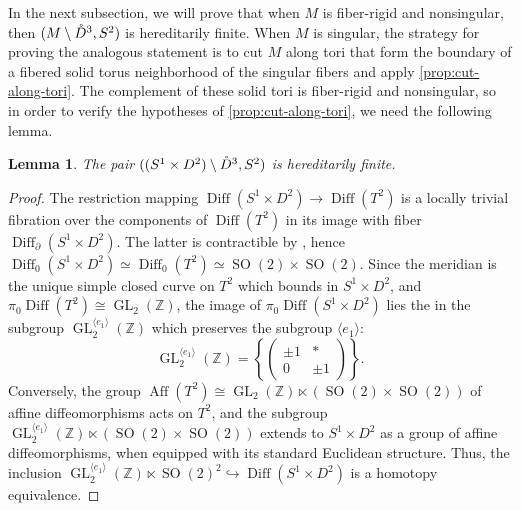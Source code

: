 \documentclass{amsart}
\theoremstyle{plain}
\newtheorem{lem}[thm]{Lemma}
\theoremstyle{definition}
\DeclareMathOperator\Diff{Diff}
\DeclareMathOperator\Aff{Aff}
\DeclareMathOperator\SO{SO}
\DeclareMathOperator\GL{GL}
\newcommand{\interior}[1]{\smash{\mathring{#1}}}
\newcommand{\Z}{\mathbb{Z}}
\begin{document}
In the next subsection, we will prove that when $M$ is fiber-rigid and nonsingular, then $(M \setminus \interior{D}^3, S^2)$ is hereditarily finite. 
When $M$ is singular, the strategy for proving the analogous statement is to cut $M$ along tori that form the boundary of a fibered solid torus neighborhood of the singular fibers and apply \cref{prop:cut-along-tori}.  The complement of these solid tori is fiber-rigid and nonsingular, so in order to verify the hypotheses of \cref{prop:cut-along-tori}, we need the following lemma.

\begin{lem}\label{lem:solid-torus}
    The pair $((S^1 \times D^2 )\setminus \interior{D}^3, S^2)$ is hereditarily finite. 
\end{lem}
\begin{proof}
The restriction mapping $\Diff(S^1\times D^2)\rightarrow \Diff(T^2)$ is a locally trivial fibration over the components of $\Diff(T^2)$ in its image with fiber $\Diff_\partial(S^1\times D^2)$. The latter is contractible by \cite{Hatcher76, Ivanov76}, hence $\Diff_0(S^1\times D^2)\simeq\Diff_0(T^2)\simeq \SO(2)\times \SO(2)$. Since the meridian is the unique simple closed curve on $T^2$ which bounds in $S^1\times D^2$, and $\pi_0\Diff(T^2)\cong \GL_2(\Z)$, the image of $\pi_0\Diff(S^1\times D^2)$ lies the in the subgroup $\GL_2^{\langle e_1\rangle}(\Z)$ which preserves the subgroup $\langle e_1\rangle$:
\[\GL_2^{\langle e_1\rangle}(\Z)=\left\{
        \begin{pmatrix}
            \pm 1 & * \\
            0 & \pm 1
        \end{pmatrix}
        \right\}.\] 
Conversely, the group $\Aff(T^2)\cong\GL_2(\Z)\ltimes (\SO(2)\times \SO(2))$ of affine diffeomorphisms acts on $T^2$, and the subgroup $\GL_2^{\langle e_1\rangle}(\Z)\ltimes(\SO(2)\times \SO(2)) $ extends to $S^1\times D^2$ as a group of affine diffeomorphisms, when equipped with its standard Euclidean structure. Thus, the inclusion $\GL_2^{\langle e_1\rangle}(\Z)\ltimes\SO(2)^2 \hookrightarrow \Diff(S^1\times D^2)$ is a homotopy equivalence.



\end{proof}
\end{document}
